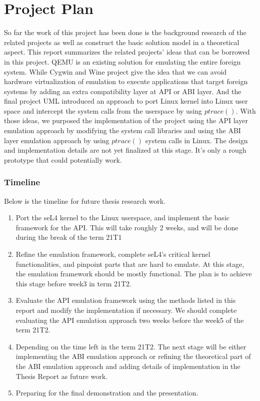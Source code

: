 \chapter{Project Plan}\label{ch:projplan}

So far the work of this project has been done is the background research of the related projects as well as construct the basic solution model in a theoretical aspect. This report summarizes the related projects' ideas that can be borrowed in this project. QEMU is an existing solution for emulating the entire foreign system. While Cygwin and Wine project give the idea that we can avoid hardware virtualization of emulation to execute applications that target foreign systems by adding an extra compatibility layer at API or ABI layer. And the final project UML introduced an approach to port Linux kernel into Linux user space and intercept the system calls from the userspace by using $ptrace()$. With those ideas, we purposed the implementation of the project using the API layer emulation approach by modifying the system call libraries and using the ABI layer emulation approach by using $ptrace()$ system calls in Linux. The design and implementation details are not yet finalized at this stage. It's only a rough prototype that could potentially work. 

\subsection{Timeline}
Below is the timeline for future thesis research work.

\begin{enumerate}
    \item Port the seL4 kernel to the Linux userspace, and implement the basic framework for the API. This will take roughly 2 weeks, and will be done during the break of the term 21T1
    \item Refine the emulation framework, complete seL4's critical kernel functionalities, and pinpoint parts that are hard to emulate. At this stage, the emulation framework should be mostly functional. The plan is to achieve this stage before week3 in term 21T2.
    \item Evaluate the API emulation framework using the methods listed in this report and modify the implementation if necessary. We should complete evaluating the API emulation approach two weeks before the week5 of the term 21T2.
    \item Depending on the time left in the term 21T2. The next stage will be either implementing the ABI emulation approach or refining the theoretical part of the ABI emulation approach and adding details of implementation in the Thesis Report as future work.
    \item Preparing for the final demonstration and the presentation.
\end{enumerate}